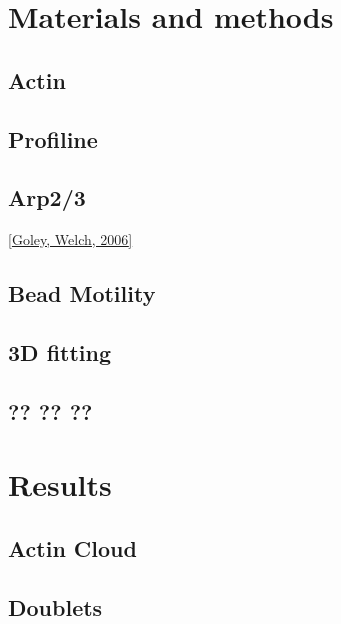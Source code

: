 \documentclass[A4paperpaper,11pt,english]{sphinxmanual}
\begin{document}
\chapter{Materials and methods}
\label{parts/part2::doc}\label{parts/part2:materials-and-methods}

\section{Actin}
\label{parts/part2:actin}

\section{Profiline}
\label{parts/part2:profiline}

\section{Arp2/3}
\label{parts/part2:arp2-3}
{\hyperref[bibitem:goley2006]{{[}Goley, Welch,  2006{]}}}


\section{Bead Motility}
\label{parts/part2:bead-motility}

\section{3D fitting}
\label{parts/part2:d-fitting}

\section{?? ?? ??}
\label{parts/part2:id2}

\chapter{Results}
\label{parts/part3::doc}\label{parts/part3:results}

\section{Actin Cloud}
\label{parts/part3:actin-cloud}

\section{Doublets}
\label{parts/part3:doublets}
\end{document}
